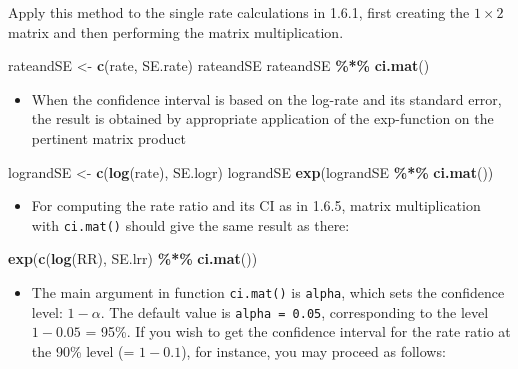 \documentclass[
]{book}
\newenvironment{Shaded}{\begin{snugshade}}{\end{snugshade}}
\newcommand{\FunctionTok}[1]{\textcolor[rgb]{0.13,0.29,0.53}{\textbf{#1}}}
\newcommand{\NormalTok}[1]{#1}
\newcommand{\OtherTok}[1]{\textcolor[rgb]{0.56,0.35,0.01}{#1}}
\newcommand{\SpecialCharTok}[1]{\textcolor[rgb]{0.81,0.36,0.00}{\textbf{#1}}}
\providecommand{\tightlist}{%
  \setlength{\itemsep}{0pt}\setlength{\parskip}{0pt}}
\begin{document}
Apply this method to the single rate calculations in 1.6.1, first creating the \(1 \times 2\) matrix and then performing the matrix multiplication.

\begin{Shaded}
\begin{Highlighting}[]
\NormalTok{rateandSE }\OtherTok{\textless{}{-}} \FunctionTok{c}\NormalTok{(rate, SE.rate)}
\NormalTok{rateandSE}
\NormalTok{rateandSE }\SpecialCharTok{\%*\%} \FunctionTok{ci.mat}\NormalTok{()}
\end{Highlighting}
\end{Shaded}

\begin{itemize}
\tightlist
\item
  When the confidence interval is based on the log-rate and its
  standard error, the result is obtained by appropriate application of
  the exp-function on the pertinent matrix product
\end{itemize}

\begin{Shaded}
\begin{Highlighting}[]
\NormalTok{lograndSE }\OtherTok{\textless{}{-}} \FunctionTok{c}\NormalTok{(}\FunctionTok{log}\NormalTok{(rate), SE.logr)}
\NormalTok{lograndSE}
\FunctionTok{exp}\NormalTok{(lograndSE }\SpecialCharTok{\%*\%} \FunctionTok{ci.mat}\NormalTok{())}
\end{Highlighting}
\end{Shaded}

\begin{itemize}
\tightlist
\item
  For computing the rate ratio and its CI as in 1.6.5, matrix
  multiplication with \texttt{ci.mat()} should give the same result as
  there:
\end{itemize}

\begin{Shaded}
\begin{Highlighting}[]
\FunctionTok{exp}\NormalTok{(}\FunctionTok{c}\NormalTok{(}\FunctionTok{log}\NormalTok{(RR), SE.lrr) }\SpecialCharTok{\%*\%} \FunctionTok{ci.mat}\NormalTok{())}
\end{Highlighting}
\end{Shaded}

\begin{itemize}
\tightlist
\item
  The main argument in function \texttt{ci.mat()} is \texttt{alpha},
  which sets the confidence level: \(1 - \alpha\). The default value is
  \texttt{alpha\ =\ 0.05}, corresponding to the level \(1 - 0.05\) = 95\%.
  If you wish to get the confidence interval for the rate ratio at
  the 90\% level (= \(1-0.1\)), for instance, you may proceed as
  follows:
\end{itemize}
\end{document}
